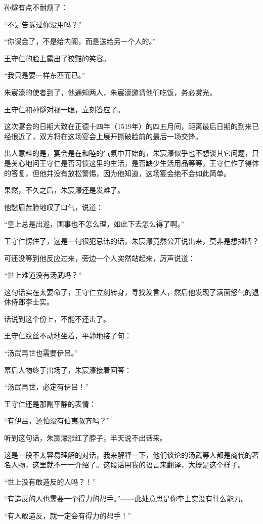 \begin{multicols}{\theparacolNo}
孙燧有点不耐烦了：

“不是告诉过你没用吗？”

“你误会了，不是给内阁，而是送给另一个人的。”

王守仁的脸上露出了狡黠的笑容。

“我只是要一样东西而已。”

朱宸濠的使者到了，他通知两人，朱宸濠邀请他们吃饭，务必赏光。

王守仁和孙燧对视一眼，立刻答应了。

这次宴会的日期大致在正德十四年（1519年）的四五月间，距离最后日期的到来已经很近了，双方将在这场宴会上展开撕破脸前的最后一场交锋。

出人意料的是，宴会是在和睦的气氛中开始的，朱宸濠似乎也不想谈其它问题，只是关心地问王守仁是否习惯这里的生活，是否缺少生活用品等等，王守仁作了得体的答复，但他并没有放松警惕，因为他知道，这场宴会绝不会如此简单。

果然，不久之后，朱宸濠还是发难了。

他愁眉苦脸地叹了口气，说道：

“皇上总是出巡，国事也不怎么理，如此下去怎么得了啊。”

王守仁愣住了，这是一句很犯忌讳的话，朱宸濠竟然公开说出来，莫非是想摊牌？

可还没等到他反应过来，旁边一个人突然站起来，厉声说道：

“世上难道没有汤武吗？”

这句话实在太要命了，王守仁立刻转身，寻找发言人，然后他发现了满面怒气的退休侍郎李士实。

话说到这个份上，不能不还击了。

王守仁纹丝不动地坐着，平静地接了句：

“汤武再世也需要伊吕。”

幕后人物终于出场了，朱宸濠接着回答：

“汤武再世，必定有伊吕！”

王守仁还是那副平静的表情：

“有伊吕，还怕没有伯夷叔齐吗？”

听到这句话，朱宸濠涨红了脖子，半天说不出话来。

这是一段不太容易理解的对话，我来解释一下，他们谈论的汤武等人都是商代的著名人物，这里就不一一介绍了。这段话用我的语言来翻译，大概是这个样子。

“世上没有敢造反的人吗？！”

“有造反的人也需要一个得力的帮手。”——此处意思是你李士实没有什么能力。

“有人敢造反，就一定会有得力的帮手！”


\end{multicols}
